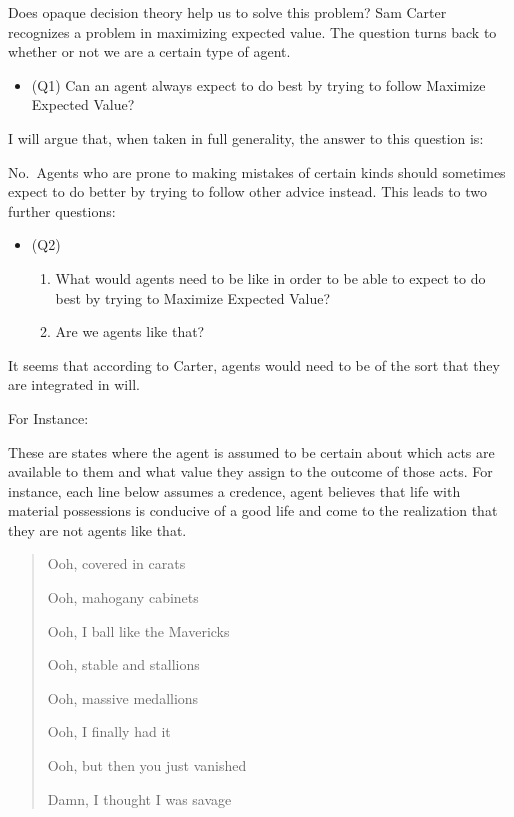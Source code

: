 \documentclass[
  letterpaper,
  DIV=11,
  numbers=noendperiod]{scrartcl}
\providecommand{\tightlist}{%
  \setlength{\itemsep}{0pt}\setlength{\parskip}{0pt}}
\begin{document}
Does opaque decision theory help us to solve this problem? Sam Carter
recognizes a problem in maximizing expected value. The question turns
back to whether or not we are a certain type of agent.

\begin{itemize}
\tightlist
\item
  (Q1) Can an agent always expect to do best by trying to follow
  Maximize Expected Value?
\end{itemize}

I will argue that, when taken in full generality, the answer to this
question is:

No.~Agents who are prone to making mistakes of certain kinds should
sometimes expect to do better by trying to follow other advice instead.
This leads to two further questions:

\begin{itemize}
\item
  (Q2)

  \begin{enumerate}
  \def\labelenumi{\alph{enumi}.}
  \item
    What would agents need to be like in order to be able to expect to
    do best by trying to Maximize Expected Value?
  \item
    Are we agents like that?
  \end{enumerate}
\end{itemize}

It seems that according to Carter, agents would need to be of the sort
that they are integrated in will.

For Instance:

These are states where the agent is assumed to be certain about which
acts are available to them and what value they assign to the outcome of
those acts. For instance, each line below assumes a credence, agent
believes that life with material possessions is conducive of a good life
and come to the realization that they are not agents like that.

\begin{quote}
Ooh, covered in carats

Ooh, mahogany cabinets

Ooh, I ball like the Mavericks

Ooh, stable and stallions

Ooh, massive medallions

Ooh, I finally had it

Ooh, but then you just vanished

Damn, I thought I was savage
\end{quote}
\end{document}
